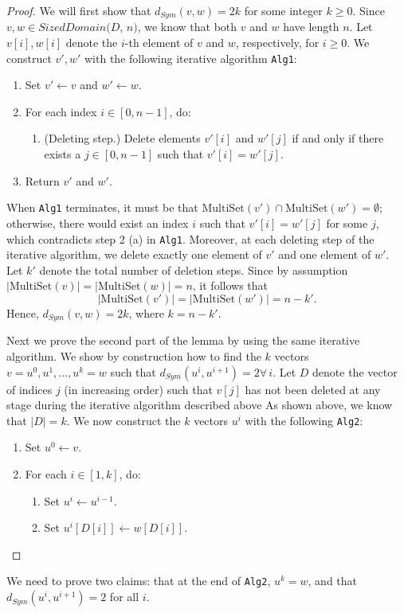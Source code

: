 \documentclass[11pt,a4paper]{article}
\theoremstyle{definition}
\newcommand{\MultiSet}{\mathrm{MultiSet}}
\newcommand{\silvia}[1]{{ {\color{blue}{(silvia)~#1}}}}
\begin{document}
\begin{proof}
    We will first show that $d_{Sym}(v, w) = 2k$ for some integer $k \geq 0$. Since $v, w \in \textit{SizedDomain(D, n)}$, we know that both $v$ and $w$ have length $n$. Let $v[i], w[i]$ denote the $i$-th element of $v$ and $w$, respectively, for $i \geq 0$. We construct $v', w'$ with the following iterative algorithm \texttt{Alg1}: 
    \begin{enumerate}
        \item Set $v' \leftarrow v$ and $w' \leftarrow w$.
        \item For each index $i \in [0, n-1]$, do:
        \begin{enumerate}
            \item (Deleting step.) Delete elements $v'[i]$ and $w'[j]$ if and only if there exists a $j \in [0, n-1]$ such that $v'[i] = w'[j]$.
        \end{enumerate}
        \item Return $v'$ and $w'$.
    \end{enumerate}
    When \texttt{Alg1} terminates, it must be that $\MultiSet(v') \cap \MultiSet(w') = \emptyset$; otherwise, there would exist an index $i$ such that $v'[i] = w'[j]$ for some $j$, which contradicts step 2 (a) in \texttt{Alg1}. Moreover, at each deleting step of the iterative algorithm, we delete exactly one element of $v'$ and one element of $w'$. Let $k'$ denote the total number of deletion steps. Since by assumption $|\MultiSet(v)| = |\MultiSet(w)| = n$, it follows that
    \[
        |\MultiSet(v')| = |\MultiSet(w')| = n-k'.
    \]
    Hence, $d_{Sym}(v, w) = 2k$, where $k = n-k'$.
    
    Next we prove the second part of the lemma by using the same iterative algorithm. We show by construction how to find the $k$ vectors $v = u^0, u^1, \ldots, u^k = w$ such that $d_{Sym}(u^i, u^{i+1}) = 2 \forall \, i$. Let $D$ denote \silvia{Letter already taken} the vector of indices $j$ (in increasing order) such that $v[j]$ has not been deleted at any stage during the iterative algorithm described above As shown above, we know that $|D| = k$. We now construct the $k$ vectors $u^i$ with the following \texttt{Alg2}:
    \begin{enumerate}
        \item Set $u^0 \leftarrow v$.
        \item For each $i \in [1, k]$, do:
        \begin{enumerate}
            \item Set $u^i \leftarrow u^{i-1}$.
            \item Set $u^i[D[i]] \leftarrow w[D[i]]$.
        \end{enumerate}
    \end{enumerate}
\end{proof}
We need to prove two claims: that at the end of \texttt{Alg2}, $u^k = w$, and that $d_{Sym}(u^i, u^{i+1}) = 2$ for all $i$. \silvia{Problem of ordering. Needs finishing.}
\end{document}
